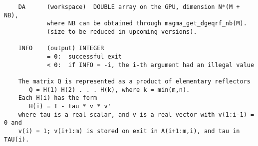 \documentclass[10pt]{book}
\begin{document}
\begin{verbatim}
    DA      (workspace)  DOUBLE array on the GPU, dimension N*(M + NB), 
            where NB can be obtained through magma_get_dgeqrf_nb(M).
            (size to be reduced in upcoming versions).

    INFO    (output) INTEGER   
            = 0:  successful exit   
            < 0:  if INFO = -i, the i-th argument had an illegal value   
  
    The matrix Q is represented as a product of elementary reflectors   
       Q = H(1) H(2) . . . H(k), where k = min(m,n).   
    Each H(i) has the form   
       H(i) = I - tau * v * v'   
    where tau is a real scalar, and v is a real vector with v(1:i-1) = 0 and 
    v(i) = 1; v(i+1:m) is stored on exit in A(i+1:m,i), and tau in TAU(i).   
\end{verbatim}

\newpage
\end{document}
